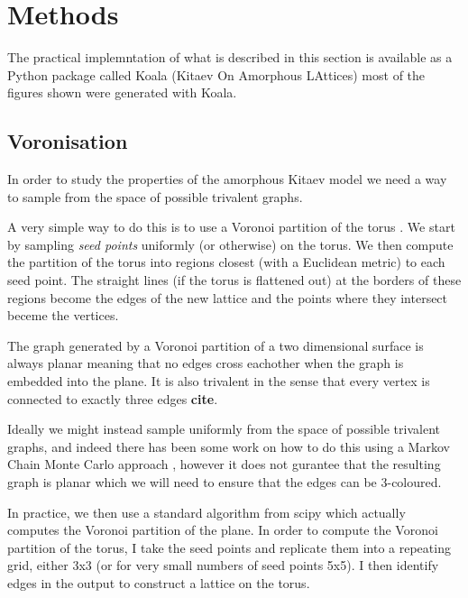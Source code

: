 \hypertarget{methods}{%
\section{Methods}\label{methods}}

The practical implemntation of what is described in this section is
available as a Python package called Koala (Kitaev On Amorphous
LAttices) \textcite{tomImperialCMTHKoalaFirst2022} most of the figures
shown were generated with Koala.

\hypertarget{voronisation}{%
\subsection{Voronisation}\label{voronisation}}

In order to study the properties of the amorphous Kitaev model we need a
way to sample from the space of possible trivalent graphs.

A very simple way to do this is to use a Voronoi partition of the torus
\autocite{mitchellAmorphousTopologicalInsulators2018,marsalTopologicalWeaireThorpeModels2020,florescu_designer_2009}.
We start by sampling \emph{seed points} uniformly (or otherwise) on the
torus. We then compute the partition of the torus into regions closest
(with a Euclidean metric) to each seed point. The straight lines (if the
torus is flattened out) at the borders of these regions become the edges
of the new lattice and the points where they intersect beceme the
vertices.

The graph generated by a Voronoi partition of a two dimensional surface
is always planar meaning that no edges cross eachother when the graph is
embedded into the plane. It is also trivalent in the sense that every
vertex is connected to exactly three edges \textbf{cite}.

Ideally we might instead sample uniformly from the space of possible
trivalent graphs, and indeed there has been some work on how to do this
using a Markov Chain Monte Carlo approach
\textcite{alyamiUniformSamplingDirected2016}, however it does not
gurantee that the resulting graph is planar which we will need to ensure
that the edges can be 3-coloured.

In practice, we then use a standard algorithm
\textcite{barberQuickhullAlgorithmConvex1996} from scipy
\textcite{virtanenSciPyFundamentalAlgorithms2020a} which actually
computes the Voronoi partition of the plane. In order to compute the
Voronoi partition of the torus, I take the seed points and replicate
them into a repeating grid, either 3x3 (or for very small numbers of
seed points 5x5). I then identify edges in the output to construct a
lattice on the torus.

